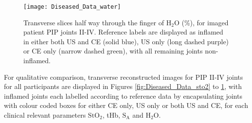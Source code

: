 \documentclass[twoside]{bhamthesis}
\theoremstyle{definition}
\begin{document}
\begin{figure}[!ht]
\centering\texttt{[image: Diseased\_Data\_water]}
\caption{Transverse slices half way through the finger of $\mathrm{H_2O}$ (\%), for imaged patient PIP joints II-IV. Reference labels are displayed as inflamed in either both US and CE (solid blue), US only (long dashed purple) or CE only (narrow dashed green), with all remaining joints non-inflamed.}
\label{fig:Diseased_Data_water}
\end{figure}

For qualitative comparison, transverse reconstructed images for PIP II-IV joints for all participants are displayed in Figures \ref{fig:Diseased_Data_sto2} to \ref{fig:Diseased_Data_water}, with inflamed joints each labelled according to reference data by encapsulating joints with colour coded boxes for either CE only, US only or both US and CE, for each clinical relevant parameters $\mathrm{StO_2}$, tHb, $\mathrm{S_A}$ and $\mathrm{H_2O}$.
\end{document}
